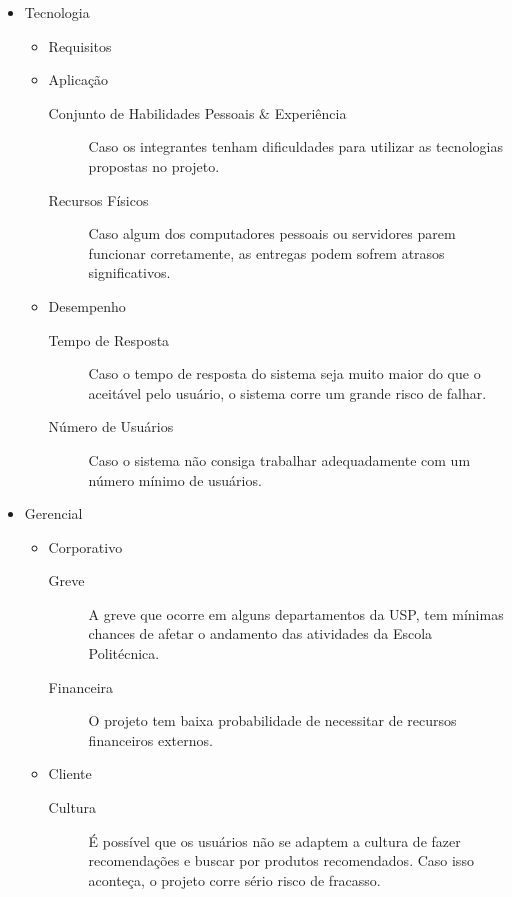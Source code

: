\documentclass[]{article}
\begin{document}
\begin{itemize}
  
  \item Tecnologia
  \begin{itemize}
    \item Requisitos
    \item Aplicação
    \begin{description}
      \item[Conjunto de Habilidades Pessoais \& Experiência] Caso os integrantes tenham dificuldades para utilizar as tecnologias propostas no projeto.
      \item[Recursos Físicos] Caso algum dos computadores pessoais ou servidores parem funcionar corretamente, as entregas podem sofrem atrasos significativos.
    \end{description}
    \item Desempenho
    \begin{description}
      \item[Tempo de Resposta] Caso o tempo de resposta do sistema seja muito maior do que o aceitável pelo usuário, o sistema corre um grande risco de falhar.
      \item[Número de Usuários] Caso o sistema não consiga trabalhar adequadamente com um número mínimo de usuários.
    \end{description}
  \end{itemize}
  
  \item Gerencial
  \begin{itemize}
    \item Corporativo
    \begin{description}
      \item[Greve] A greve que ocorre em alguns departamentos da USP, tem mínimas chances de afetar o andamento das atividades da Escola Politécnica.
      \item[Financeira] O projeto tem baixa probabilidade de necessitar de recursos financeiros externos.
    \end{description}
    \item Cliente
    \begin{description}
      \item[Cultura] É possível que os usuários não se adaptem a cultura de fazer recomendações e buscar por produtos recomendados. Caso isso aconteça, o projeto corre sério risco de fracasso. 
    \end{description}
  \end{itemize}
  

\end{itemize}
\end{document}
